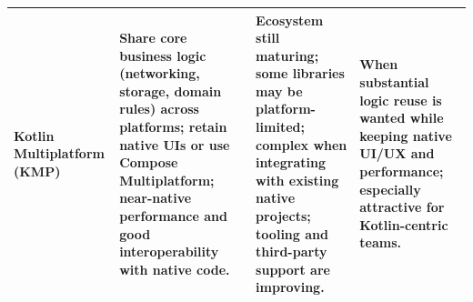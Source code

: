 \begin{table}[ht]
\begin{tabularx}{\textwidth}{|p{3.2cm}|Y|Y|Y|}
        \hline

        Kotlin Multiplatform (KMP) &
        Share core business logic (networking, storage, domain rules) across platforms; retain native UIs or use Compose Multiplatform; near-native performance and good interoperability with native code. &
        Ecosystem still maturing; some libraries may be platform-limited; complex when integrating with existing native projects; tooling and third-party support are improving. &
        When  substantial logic reuse is wanted while keeping native UI/UX and performance; especially attractive for Kotlin-centric teams. \\
        \hline
    \end{tabularx}
\end{table}



